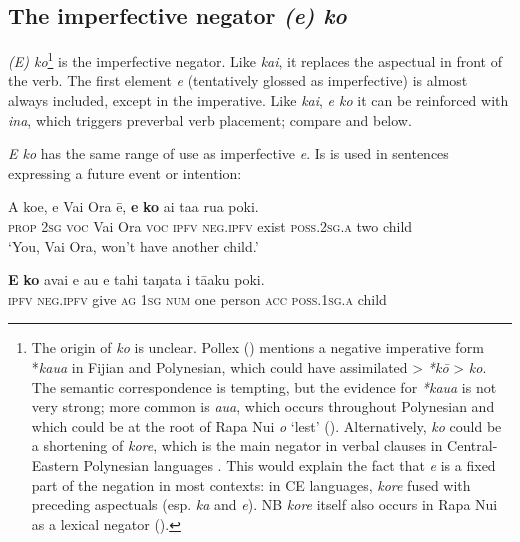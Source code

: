 \subsection{The imperfective negator \textit{(e) ko}}\label{sec:10.5.4}

\textit{(E) ko}\footnote{\label{fn:499}The origin of \textit{ko} is unclear. Pollex (\citealt{GreenhillClark2011}) mentions a negative imperative form *\textit{kaua} in Fijian and Polynesian, which could have assimilated {\textgreater} \textit{*kō} {\textgreater} \textit{ko}. The semantic correspondence is tempting, but the evidence for \textit{*kaua} is not very strong; more common is \textit{{\ꞌ}aua}, which occurs throughout Polynesian and which could be at the root of Rapa Nui \textit{{\ꞌ}o} ‘lest’ (). Alternatively, \textit{ko} could be a shortening of \textit{kore}, which is the main negator in verbal clauses in Central-Eastern Polynesian languages \citep[100]{Clark1976}. This would explain the fact that \textit{e} is a fixed part of the negation in most contexts: in CE languages, \textit{kore} fused with preceding aspectuals (esp. \textit{ka} and \textit{e}). NB \textit{kore} itself also occurs in Rapa Nui as a lexical negator ().} is the imperfective negator. Like \textit{kai}, it replaces the aspectual in front of the verb. The first element \textit{e} (tentatively glossed as imperfective) is almost always included, except in the imperative. Like \textit{kai}, \textit{e ko} it can be reinforced with \textit{{\ꞌ}ina}, which triggers preverbal verb placement; compare  and  below.

\textit{E ko} has the same range of use as imperfective \textit{e}. Is is used in sentences expressing a future event or intention:

\ea\label{ex:10.125}
\gll A koe, e Vai Ora ē, \textbf{e} \textbf{ko} ai ta{\ꞌ}a rua poki. \\
\textsc{prop} \textsc{2sg} \textsc{voc} Vai Ora \textsc{voc} \textsc{ipfv} \textsc{neg.ipfv} exist \textsc{poss.2sg.a} two child \\

\glt 
‘You, Vai Ora, won’t have another child.’ \textstyleExampleref{[R301.077]} 
\z

\ea\label{ex:10.126}
\gll \textbf{E} \textbf{ko} {\ꞌ}avai e au e tahi taŋata i tā{\ꞌ}aku poki. \\
\textsc{ipfv} \textsc{neg.ipfv} give \textsc{ag} \textsc{1sg} \textsc{num} one person \textsc{acc} \textsc{poss.1sg.a} child \\

